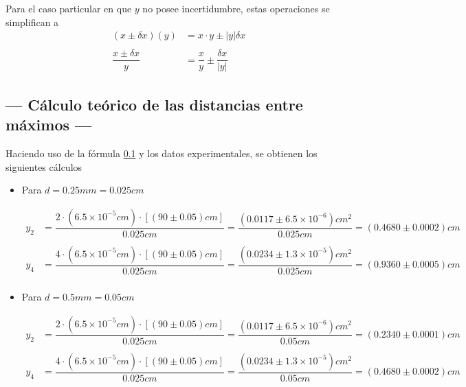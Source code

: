 \documentclass[10pt,a4paper]{article}
\begin{document}
	Para el caso particular en que $ y $ no posee incertidumbre, estas operaciones se simplifican a
	\begin{align*}
		(x\pm\delta x)(y)&=x\cdot y\pm|y|\delta x\\\\
		\dfrac{x\pm\delta x}{y}&=\dfrac{x}{y}\pm\dfrac{\delta x}{|y|}
	\end{align*} 

	\subsection{--- Cálculo teórico de las distancias entre máximos ---}	
	
	Haciendo uso de la fórmula \ref{} y los datos experimentales, se obtienen los siguientes cálculos
	\begin{itemize}
		\item Para $ d=0.25mm=0.025cm $

		\begin{align*}
			y_2&=\dfrac{2\cdot (6.5\times10^{-5}cm)\cdot[(90\pm 0.05) cm]}{0.025 cm}=
			\dfrac{(0.0117\pm 6.5\times 10^{-6}) cm^2}{0.025 cm}=
			(0.4680\pm 0.0002)cm\\\\
			y_4&=\dfrac{4\cdot (6.5\times10^{-5}cm)\cdot[(90\pm 0.05) cm]}{0.025 cm}=
			\dfrac{(0.0234\pm1.3\times 10^{-5})cm^2}{0.025 cm}=
			(0.9360\pm0.0005)cm\\
		\end{align*}
	
		\item Para $ d=0.5mm=0.05cm $
		
		\begin{align*}
			y_2&=\dfrac{2\cdot (6.5\times10^{-5}cm)\cdot[(90\pm 0.05) cm]}{0.025 cm}=
			\dfrac{(0.0117\pm 6.5\times 10^{-6}) cm^2}{0.05 cm}=
			(0.2340\pm 0.0001)cm\\\\
			y_4&=\dfrac{4\cdot (6.5\times10^{-5}cm)\cdot[(90\pm 0.05) cm]}{0.025 cm}=
			\dfrac{(0.0234\pm1.3\times 10^{-5})cm^2}{0.05 cm}=
			(0.4680\pm0.0002)cm\\
		\end{align*}	
		 
	\end{itemize}
\end{document}
